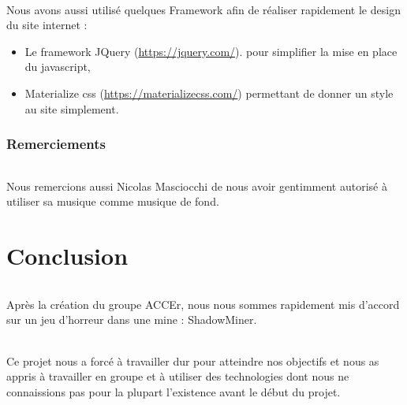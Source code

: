 \documentclass[titlepage, 13px, a4paper]{report}
\begin{document}
\paragraph{} \hspace{0pt}
Nous avons aussi utilisé quelques Framework  afin de réaliser rapidement le design du site internet :
{\begin{itemize}
	\item Le framework JQuery (\url{https://jquery.com/}). pour simplifier la mise en place du javascript,
	\item Materialize css (\url{https://materializecss.com/}) permettant de donner un style au site simplement. \\
\end{itemize}}

\section{Remerciements}
\paragraph{} \hspace{0pt}
Nous remercions aussi Nicolas Masciocchi de nous avoir gentimment autorisé à utiliser sa musique comme musique de fond. \\


\newpage


\part{Conclusion}
\paragraph{} \hspace{0pt}
Après la création du groupe ACCEr, nous nous sommes rapidement mis d’accord sur un jeu 
d’horreur dans une mine : ShadowMiner. \\

\paragraph{} \hspace{0pt}
Ce projet nous a forcé à travailler dur pour atteindre nos objectifs et nous as appris à 
travailler en groupe et à utiliser des technologies dont nous ne connaissions pas pour la 
plupart l’existence avant le début du projet. \\
\end{document}
